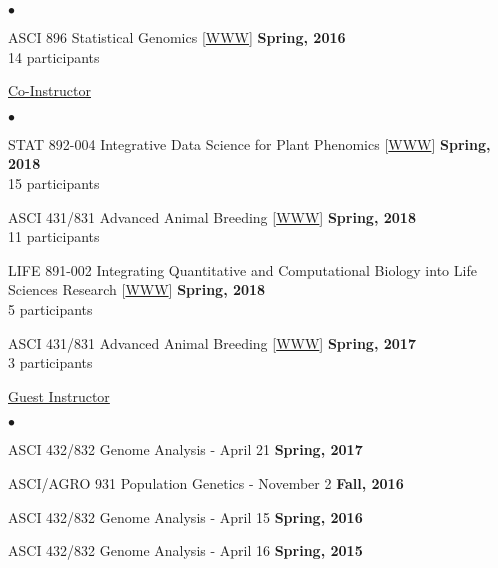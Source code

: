 \documentclass[margin,line,10pt]{res}
\newenvironment{list2}{
  \begin{list}{$\bullet$}{%
      \setlength{\itemsep}{0in}
      \setlength{\parsep}{0in} \setlength{\parskip}{0in}
      \setlength{\topsep}{0in} \setlength{\partopsep}{0in} 
      \setlength{\leftmargin}{0.2in}}}{\end{list}}
\begin{document}
\begin{resume}
\begin{list2}
\item ASCI 896 Statistical Genomics [\textcolor{blue}{\href{http://morotalab.org/asci896-2016/ASCI896.html}{WWW}}]
  \hfill {\bf Spring, 2016} \\
14 participants %

\end{list2}
\vspace{.01pt}
        

\underline{Co-Instructor} 
\vspace{0.4cm}
\begin{list2}
  
\item STAT 892-004 Integrative Data Science for Plant Phenomics [\textcolor{blue}{\href{http://morotalab.org/stat892-2018/STAT892.html}{WWW}}]
  \hfill {\bf Spring, 2018} \\
  15 participants 

\vspace{0.5cm}
  
\item ASCI 431/831 Advanced Animal Breeding [\textcolor{blue}{\href{http://morotalab.org/asci431-2018/ASCI431-831.html}{WWW}}]
  \hfill {\bf Spring, 2018} \\
  11 participants 

  \vspace{0.5cm}

\item LIFE 891-002 Integrating Quantitative and Computational Biology into Life Sciences Research [\textcolor{blue}{\href{http://morotalab.org/life431-2018/life431-831.html}{WWW}}]
  \hfill {\bf Spring, 2018}  \\
 5 participants  

 \vspace{0.5cm}

\item ASCI 431/831 Advanced Animal Breeding [\textcolor{blue}{\href{http://morotalab.org/asci431-2017/ASCI431-831.html}{WWW}}]
  \hfill {\bf Spring, 2017}  \\
 3 participants 
\end{list2}

 \vspace{.01pt}

\underline{Guest Instructor}
 \vspace{0.4cm}
 \begin{list2}
 \item ASCI 432/832 Genome Analysis - April 21  \hfill {\bf Spring, 2017}
\vspace{0.5cm}
\item ASCI/AGRO 931  Population Genetics - November 2  \hfill {\bf Fall, 2016}
\vspace{0.5cm}
\item ASCI 432/832 Genome Analysis - April 15  \hfill {\bf Spring, 2016}
\vspace{0.5cm}
\item ASCI 432/832 Genome Analysis - April 16    \hfill {\bf Spring, 2015}
\end{list2}



\end{resume}
\end{document}
